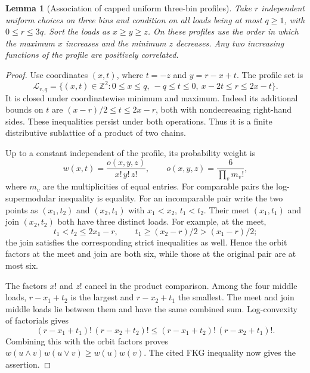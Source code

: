 \documentclass[11pt]{article}
\newtheorem{lemma}{Lemma}
\begin{document}
\begin{lemma}[Association of capped uniform three-bin profiles]\label{lem:profilefkg}
Take $r$ independent uniform choices on three bins and condition on
all loads being at most $q\geq1$, with $0\leq r\leq3q$.
Sort the loads as $x\geq y\geq z$. On these profiles use the order
in which the maximum $x$ increases and the minimum $z$ decreases.
Any two increasing functions of the profile are positively correlated.
\end{lemma}
\begin{proof}
Use coordinates $(x,t)$, where $t=-z$ and $y=r-x+t$.
The profile set is
\[
 \mathcal L_{r,q}=\{(x,t)\in\mathbb Z^2:
 0\leq x\leq q,\ -q\leq t\leq0,\ x-2t\leq r\leq2x-t\}.
\]
It is closed under coordinatewise minimum and maximum. Indeed its
additional bounds on $t$ are $(x-r)/2\leq t\leq2x-r$, both with
nondecreasing right-hand sides. These inequalities persist under
both operations. Thus it is a finite distributive sublattice of
a product of two chains.

Up to a constant independent of the profile, its probability weight is
\[
 w(x,t)=\frac{o(x,y,z)}{x!\,y!\,z!},
 \qquad o(x,y,z)=\frac{6}{\prod_v m_v!},
\]
where $m_v$ are the multiplicities of equal entries. For comparable
pairs the log-supermodular inequality is equality. For an incomparable
pair write the two points as $(x_1,t_2)$ and $(x_2,t_1)$ with
$x_1<x_2$, $t_1<t_2$. Their meet $(x_1,t_1)$ and join $(x_2,t_2)$
both have three distinct loads. For example, at the meet,
\[
 t_1<t_2\leq2x_1-r,\qquad
 t_1\geq(x_2-r)/2>(x_1-r)/2;
\]
the join satisfies the corresponding strict inequalities as well.
Hence the orbit factors at the meet and join are both six, while
those at the original pair are at most six.

The factors $x!$ and $z!$ cancel in the product comparison. Among the
four middle loads, $r-x_1+t_2$ is the largest and $r-x_2+t_1$ the
smallest. The meet and join middle loads lie between them and have
the same combined sum. Log-convexity of factorials gives
\[
 (r-x_1+t_1)!\,(r-x_2+t_2)!
 \leq(r-x_1+t_2)!\,(r-x_2+t_1)!.
\]
Combining this with the orbit factors proves
$w(u\wedge v)w(u\vee v)\geq w(u)w(v)$.
The cited FKG inequality now gives the assertion.
\end{proof}
\end{document}

